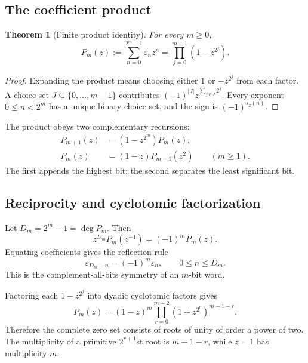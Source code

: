 \documentclass[11pt,oneside]{article}
\newtheorem{theorem}{Theorem}[section]
\theoremstyle{definition}
\theoremstyle{remark}
\newcommand{\bitsum}{s_2}
\newcommand{\eps}{\varepsilon}
\begin{document}
\subsection{The coefficient product}

\begin{theorem}[Finite product identity]\label{thm:finite-product}
For every $m\ge0$,
\begin{equation}\label{eq:finite-product}
 \boxed{\quad
 P_m(z):=\sum_{n=0}^{2^m-1}\eps_nz^n
 =\prod_{j=0}^{m-1}(1-z^{2^j}).
 \quad}
\end{equation}
\end{theorem}

\begin{proof}
Expanding the product means choosing either $1$ or $-z^{2^j}$ from each
factor.  A choice set $J\subseteq\{0,\ldots,m-1\}$ contributes
$(-1)^{|J|}z^{\sum_{j\in J}2^j}$.  Every exponent $0\le n<2^m$ has a unique
binary choice set, and the sign is $(-1)^{\bitsum(n)}$.
\end{proof}

The product obeys two complementary recursions:
\begin{align}
 P_{m+1}(z)&=(1-z^{2^m})P_m(z),\label{eq:P-adjoin}\\
 P_m(z)&=(1-z)P_{m-1}(z^2)\qquad(m\ge1).\label{eq:P-mahler-finite}
\end{align}
The first appends the highest bit; the second separates the least significant
bit.

\subsection{Reciprocity and cyclotomic factorization}

Let $D_m=2^m-1=\deg P_m$.  Then
\begin{equation}\label{eq:P-reciprocity}
 z^{D_m}P_m(z^{-1})=(-1)^mP_m(z).
\end{equation}
Equating coefficients gives the reflection rule
\begin{equation}\label{eq:reflection-rule}
 \eps_{D_m-n}=(-1)^m\eps_n,
 \qquad 0\le n\le D_m.
\end{equation}
This is the complement-all-bits symmetry of an $m$-bit word.

Factoring each $1-z^{2^j}$ into dyadic cyclotomic factors gives
\begin{equation}\label{eq:cyclotomic-factorization}
 P_m(z)=(1-z)^m
 \prod_{r=0}^{m-2}(1+z^{2^r})^{m-1-r}.
\end{equation}
Therefore the complete zero set consists of roots of unity of order a power of
two.  The multiplicity of a primitive $2^{r+1}$st root is $m-1-r$, while
$z=1$ has multiplicity $m$.
\end{document}
